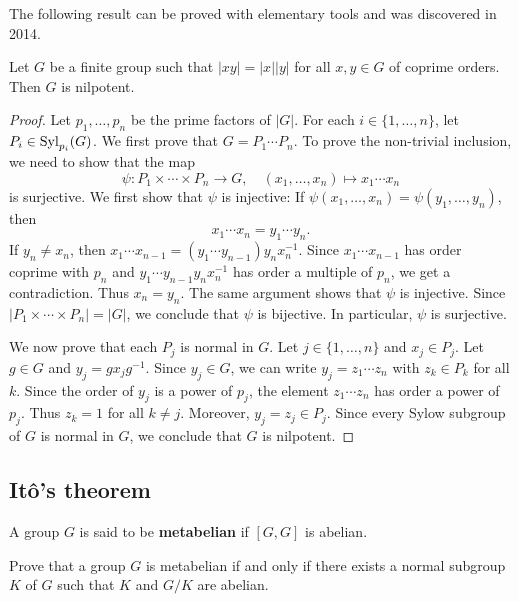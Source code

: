 The following result can be proved with elementary tools 
and was discovered 
in 2014. 

\begin{theorem}
Let $G$ be a finite group such that $|xy|=|x||y|$ for all $x,y\in G$ of coprime orders. 
Then $G$ is nilpotent. 
\end{theorem}

\begin{proof}
Let $p_1,\dots,p_n$ be the prime factors of $|G|$. For 
each 
$i\in\{1,\dots,n\}$, let $P_i\in\mathrm{Syl}_{p_i}(G)$. We first prove that 
$G=P_1\cdots P_n$. To prove the non-trivial inclusion, we need to show that 
the map
\[
	\psi\colon P_1\times\cdots\times P_n\to G,\quad
	(x_1,\dots,x_n)\mapsto x_1\cdots x_n
\]
is surjective. We first show that $\psi$ is injective: If 
$\psi(x_1,\dots,x_n)=\psi(y_1,\dots,y_n)$, then 
\[
x_1\cdots x_n=y_1\cdots y_n. 
\]
If $y_n\ne x_n$, then $x_1\cdots x_{n-1}=(y_1\cdots
y_{n-1})y_nx_n^{-1}$. Since $x_1\cdots x_{n-1}$ has order coprime with 
$p_n$ and $y_1\cdots y_{n-1}y_nx_n^{-1}$ has order a multiple of 
$p_n$, we get a contradiction. Thus  $x_n=y_n$. The same argument shows that 
$\psi$ is injective. Since $|P_1\times\cdots\times
P_n|=|G|$, we conclude that $\psi$ is bijective. In particular, 
$\psi$ is surjective. 

We now prove that each $P_j$ is normal in $G$. Let $j\in\{1,\dots,n\}$ and 
$x_j\in P_j$. Let $g\in G$ and $y_j=gx_jg^{-1}$.  Since $y_j\in G$,
we can write $y_j=z_1\cdots z_n$ with $z_k\in P_k$ for all $k$.  Since
the order of $y_j$ is a power of $p_j$, the element $z_1\cdots
z_n$ has order a power of $p_j$. Thus $z_k=1$ for all $k\ne j$. Moreover, 
$y_j=z_j\in P_j$. Since every Sylow subgroup of $G$ is normal in $G$, 
we conclude that $G$ is nilpotent. 
\end{proof}

\subsection{It\^o's theorem}

\begin{definition}
A group $G$ is said to be \textbf{metabelian} if $[G,G]$ is abelian. 
\end{definition}

\begin{exercise}
\label{xca:metabelian1}
Prove that a group $G$ is metabelian if and only if there exists a normal 
subgroup $K$ of $G$ such that $K$ and $G/K$ are abelian.
\end{exercise}

